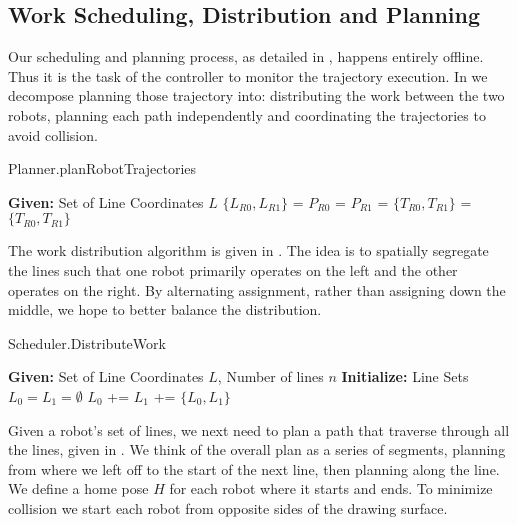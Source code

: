 
\subsection{Work Scheduling, Distribution and Planning}
\label{sec:software_sdp}

Our scheduling and planning process, as detailed in , happens entirely offline. Thus it is the task of the controller to monitor the trajectory execution. In  we decompose planning those trajectory into: distributing the work between the two robots, planning each path independently and coordinating the trajectories to avoid collision. 

\begin{algorithm}[ht!]
\caption{Planner.planRobotTrajectories}
\label{algo:sdp_overview}
\begin{algorithmic}[1]  
\State \textbf{Given:} Set of Line Coordinates $L$ 
\State $\{L_{R0}, L_{R1}\}$ = 
\State $P_{R0}$ = 
\State $P_{R1}$ = 
\State $\{T_{R0}, T_{R1}\}$ = 
\State \Return $\{T_{R0}, T_{R1}\}$
\end{algorithmic}
\end{algorithm}

The work distribution algorithm is given in . The idea is to spatially segregate the lines such that one robot primarily operates on the left and the other operates on the right. By alternating assignment, rather than assigning down the middle, we hope to better balance the distribution.  

\begin{algorithm}[ht!]
\caption{Scheduler.DistributeWork}
\label{algo:distribute}
\begin{algorithmic}[1]  
\State \textbf{Given:} Set of Line Coordinates $L$, Number of lines $n$
\State \textbf{Initialize:} Line Sets $L_{0} = L_{1} = \emptyset$
\State $L_{0}$ += 
\State $L_{1}$ += 
\EndProcedure
\State \Return $\{L_{0}, L_{1}\}$
\end{algorithmic}
\end{algorithm}

Given a robot's set of lines, we next need to plan a path that traverse through all the lines, given in . We think of the overall plan as a series of segments, planning from where we left off to the start of the next line, then planning along the line. We define a home pose $H$ for each robot where it starts and ends. To minimize collision we start each robot from opposite sides of the drawing surface.  

